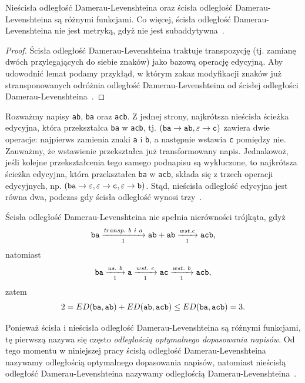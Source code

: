 \documentclass{praca1}
\begin{document}
\begin{lemma}
Nieścisła odległość Damerau-Levenshteina oraz ścisła odległość Damerau-Levenshteina są różnymi funkcjami. Co więcej, ścisła odległość Damerau-Levenshteina nie jest metryką, gdyż nie jest subaddytywna~\cite{Boytsov2011:indexingmethods}.
\end{lemma}

\begin{proof}
Ścisła odległość Damerau-Levenshteina traktuje transpozycję (tj. zamianę dwóch przylegających do siebie znaków) jako bazową operację edycyjną. Aby udowodnić lemat podamy przykłąd, w którym zakaz modyfikacji znaków już stransponowanych odróżnia odległość Damerau-Levenshteina od ścisłej odległości Damerau-Levenshteina~\cite{Boytsov2011:indexingmethods}.
\end{proof}

Rozważmy napisy \verb|ab|, \verb|ba| oraz \verb|acb|. Z jednej strony, najkrótsza nieścisła ścieżka edycyjna, która przekształca \verb|ba| w \verb|acb|, tj. $(\verb|ba| \rightarrow \verb|ab|, \varepsilon \rightarrow \verb|c|)$ zawiera dwie operacje: najpierws zamienia znaki \verb|a| i \verb|b|, a następnie wstawia \verb|c| pomiędzy nie. Zauważmy, że wstawienie przekształca już transformowany napis. Jednakowoż, jeśli kolejne przekształcenia tego samego podnapisu są wykluczone, to najkrótsza ścieżka edycyjna, która przekształca \verb|ba| w \verb|acb|, składa się z trzech operacji edycyjnych, np. $(\verb|ba| \rightarrow \varepsilon, \varepsilon \rightarrow \verb|c|, \varepsilon \rightarrow \verb|b|)$. Stąd, nieścisła odległość edycyjna jest równa dwa, podczas gdy ścisła odległość wynosi trzy~\cite{Boytsov2011:indexingmethods}. 

Ścisła odległość Damerau-Levenshteina nie spełnia nierówności trójkąta, gdyż
$$
\verb|ba|  \xrightarrow[1]{transp.\ b\ i \ a} \verb|ab| + \verb|ab| \xrightarrow[1]{wst. c} \verb|acb|,
$$
natomiast
$$
\verb|ba|  \xrightarrow[1]{us.\ b} \verb|a| \xrightarrow[1]{wst.\ c} \verb|ac| \xrightarrow[1]{wst.\ b} \verb|acb|,
$$
zatem
$$
2 = ED(\verb|ba|, \verb|ab|) + ED(\verb|ab|, \verb|acb|) \leq ED(\verb|ba|, \verb|acb|) = 3.
$$

Ponieważ ścisła i nieścisła odległość Damerau-Levenshteina są różnymi funkcjami, tę pierwszą nazywa się często \emph{odległością optymalnego dopasowania napisów}. Od tego momentu w niniejszej pracy ścisłą odległość Damerau-Levenshteina nazywamy odległością optymalnego dopasowania napisów, natomiast nieścisłą odległość Damerau-Levenshteina nazywamy odległością Damerau-Levenshteina~\cite{Loo2014:stringdist}.
\end{document}
